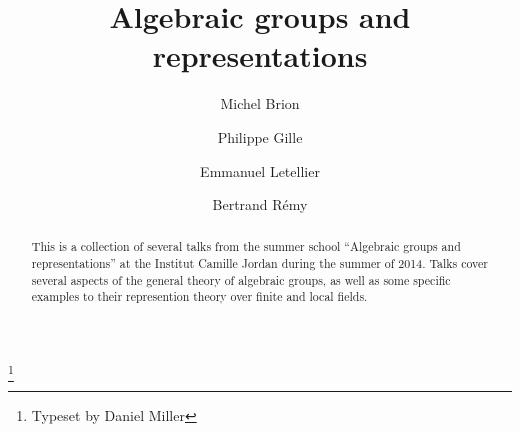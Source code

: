 \documentclass[english,letterpaper]{smfart}
\author{Michel Brion}
\author{Philippe Gille}
\author{Emmanuel Letellier}
\author{Bertrand R\'emy}
\title[Algebraic groups]{Algebraic groups and representations}
\begin{document}
\frontmatter

\begin{abstract}
This is a collection of several talks from the summer school ``Algebraic 
groups and representations'' at the Institut Camille Jordan during the 
summer of 2014.
Talks cover several aspects of the general theory of algebraic groups, as well 
as some specific examples to their represention theory over finite and local 
fields. 
\end{abstract}

\thanks{Typeset by Daniel Miller}

\maketitle
\tableofcontents
\mainmatter





%
%
%
%





\backmatter


\end{document}
